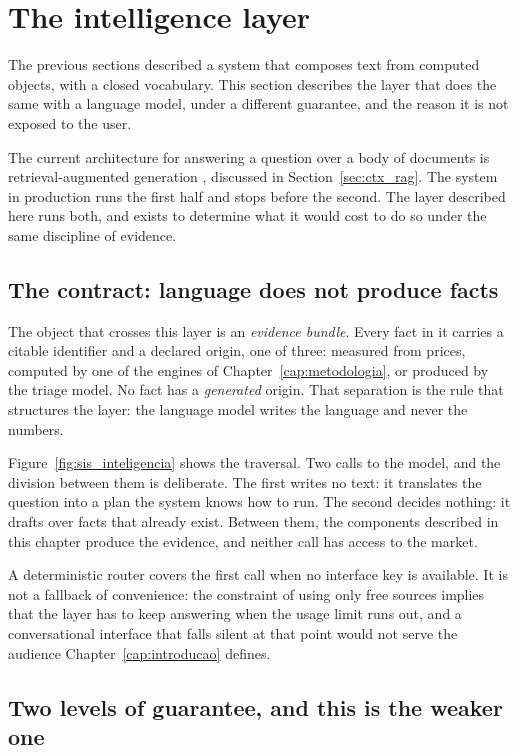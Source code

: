 \section{The intelligence layer}
\label{sec:sis_inteligencia}

The previous sections described a system that composes text from computed objects, with a closed
vocabulary. This section describes the layer that does the same with a language model, under a
different guarantee, and the reason it is not exposed to the user.

The current architecture for answering a question over a body of documents is retrieval-augmented
generation \autocite{lewis2020rag}, discussed in Section~\ref{sec:ctx_rag}. The system in
production runs the first half and stops before the second. The layer described here runs both,
and exists to determine what it would cost to do so under the same discipline of evidence.

\subsection{The contract: language does not produce facts}

The object that crosses this layer is an \emph{evidence bundle}. Every fact in it carries a citable
identifier and a declared origin, one of three: measured from prices, computed by one of the
engines of Chapter~\ref{cap:metodologia}, or produced by the triage model. No fact has a
\emph{generated} origin. That separation is the rule that structures the layer: the language model
writes the language and never the numbers.

Figure~\ref{fig:sis_inteligencia} shows the traversal. Two calls to the model, and the division
between them is deliberate. The first writes no text: it translates the question into a plan the
system knows how to run. The second decides nothing: it drafts over facts that already exist.
Between them, the components described in this chapter produce the evidence, and neither call has
access to the market.

A deterministic router covers the first call when no interface key is available. It is not a
fallback of convenience: the constraint of using only free sources implies that the layer has to
keep answering when the usage limit runs out, and a conversational interface that falls silent at
that point would not serve the audience Chapter~\ref{cap:introducao} defines.

\subsection{Two levels of guarantee, and this is the weaker one}

